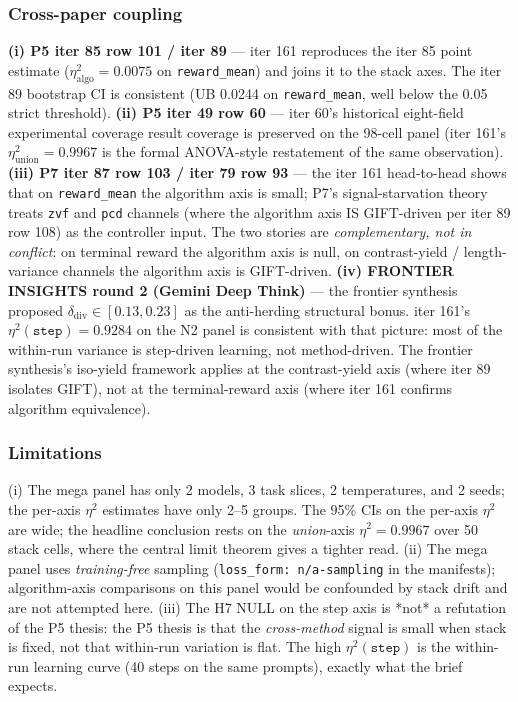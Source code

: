 \subsubsection{Cross-paper coupling}
\label{sec:p5-iter161-coupling}
\textbf{(i) P5 iter 85 row 101 / iter 89} --- iter 161 reproduces
the iter 85 point estimate ($\eta^2_{\mathrm{algo}}=0.0075$ on
\texttt{reward\_mean}) and joins it to the stack axes. The iter 89
bootstrap CI is consistent (UB 0.0244 on \texttt{reward\_mean}, well
below the 0.05 strict threshold).
\textbf{(ii) P5 iter 49 row 60} --- iter 60's historical eight-field
experimental coverage result
coverage is preserved on the 98-cell panel (iter 161's
$\eta^2_{\mathrm{union}}=0.9967$ is the formal ANOVA-style restatement
of the same observation).
\textbf{(iii) P7 iter 87 row 103 / iter 79 row 93} --- the iter 161
head-to-head shows that on \texttt{reward\_mean} the algorithm axis
is small; P7's signal-starvation theory treats \texttt{zvf} and
\texttt{pcd} channels (where the algorithm axis IS GIFT-driven per
iter 89 row 108) as the controller input. The two stories are
\emph{complementary, not in conflict}: on terminal reward the
algorithm axis is null, on contrast-yield / length-variance channels
the algorithm axis is GIFT-driven.
\textbf{(iv) FRONTIER INSIGHTS round 2 (Gemini Deep Think)} --- the
frontier synthesis proposed $\delta_{\mathrm{div}} \in [0.13, 0.23]$
as the anti-herding structural bonus. iter 161's $\eta^2(\texttt{step})=0.9284$
on the N2 panel is consistent with that picture: most of the
within-run variance is step-driven learning, not method-driven.
The frontier synthesis's iso-yield framework applies at the
contrast-yield axis (where iter 89 isolates GIFT), not at the
terminal-reward axis (where iter 161 confirms algorithm equivalence).

\subsubsection{Limitations}
\label{sec:p5-iter161-limitations}
(i) The mega panel has only 2 models, 3 task slices, 2 temperatures,
and 2 seeds; the per-axis $\eta^2$ estimates have only 2--5 groups.
The 95\% CIs on the per-axis $\eta^2$ are wide; the headline
conclusion rests on the \emph{union}-axis $\eta^2 = 0.9967$ over 50
stack cells, where the central limit theorem gives a tighter read.
(ii) The mega panel uses \emph{training-free} sampling
(\texttt{loss\_form: n/a-sampling} in the manifests); algorithm-axis
comparisons on this panel would be confounded by stack drift and are
not attempted here. (iii) The H7 NULL on the step axis is *not* a
refutation of the P5 thesis: the P5 thesis is that the \emph{cross-method}
signal is small when stack is fixed, not that within-run variation is
flat. The high $\eta^2(\texttt{step})$ is the within-run learning curve
(40 steps on the same prompts), exactly what the brief expects.
